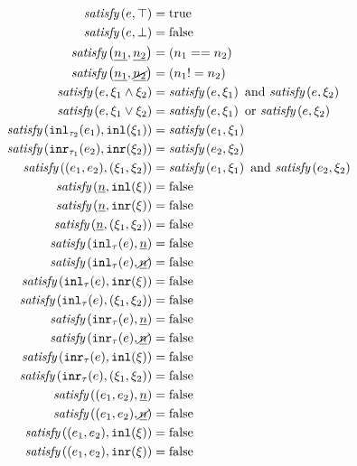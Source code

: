 \begin{subequations}\label{defn:satisfy}
\begin{align}
  \fsatisfy{e}{\ctruth} &= \text{true} \label{defn:satisfy-truth}\\
  \fsatisfy{e}{\cfalsity} &= \text{false} \label{defn:satisfy-falsity}\\
  \fsatisfy{\hnum{n_1}}{\cnum{n_2}} &= (n_1 ==n_2) \label{defn:num-satisfy-num}\\
  \fsatisfy{\hnum{n_1}}{\cnotnum{n_2}} &= (n_1 !=n_2) \\
  \fsatisfy{e}{\cand{\xi_1}{\xi_2}} &= \fsatisfy{e}{\xi_1} \text{ and } \fsatisfy{e}{\xi_2} \\
  \fsatisfy{e}{\cor{\xi_1}{\xi_2}} &= \fsatisfy{e}{\xi_1} \text{ or } \fsatisfy{e}{\xi_2} \\
  \fsatisfy{\hinl{\tau_2}{e_1}}{\cinl{\xi_1}} &= \fsatisfy{e_1}{\xi_1} \\
  \fsatisfy{\hinr{\tau_1}{e_2}}{\cinr{\xi_2}} &= \fsatisfy{e_2}{\xi_2} \\
  \fsatisfy{\hpair{e_1}{e_2}}{\cpair{\xi_1}{\xi_2}} &= \fsatisfy{e_1}{\xi_1} \text{ and } \fsatisfy{e_2}{\xi_2} \\
  \fsatisfy{\hnum{n}}{\cinl{\xi}} &= \text{false} \\
  \fsatisfy{\hnum{n}}{\cinr{\xi}} &= \text{false} \\
  \fsatisfy{\hnum{n}}{\cpair{\xi_1}{\xi_2}} &= \text{false} \\
  \fsatisfy{\hinl{\tau}{e}}{\cnum{n}} &= \text{false} \\
  \fsatisfy{\hinl{\tau}{e}}{\cnotnum{n}} &= \text{false} \\
  \fsatisfy{\hinl{\tau}{e}}{\cinr{\xi}} &= \text{false} \\
  \fsatisfy{\hinl{\tau}{e}}{\cpair{\xi_1}{\xi_2}} &= \text{false} \\
  \fsatisfy{\hinr{\tau}{e}}{\cnum{n}} &= \text{false} \\
  \fsatisfy{\hinr{\tau}{e}}{\cnotnum{n}} &= \text{false} \\
  \fsatisfy{\hinr{\tau}{e}}{\cinl{\xi}} &= \text{false} \\
  \fsatisfy{\hinr{\tau}{e}}{\cpair{\xi_1}{\xi_2}} &= \text{false} \\
  \fsatisfy{\hpair{e_1}{e_2}}{\cnum{n}} &= \text{false} \\
  \fsatisfy{\hpair{e_1}{e_2}}{\cnotnum{n}} &= \text{false} \\
  \fsatisfy{\hpair{e_1}{e_2}}{\cinl{\xi}} &= \text{false} \\
  \fsatisfy{\hpair{e_1}{e_2}}{\cinr{\xi}} &= \text{false}
\end{align}
\end{subequations}
